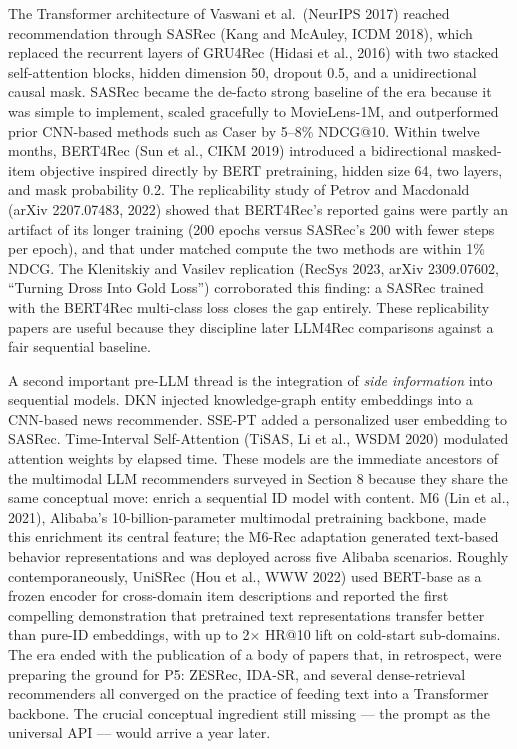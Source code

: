 \documentclass{article}
\begin{document}
The Transformer architecture of Vaswani et al.~(NeurIPS 2017) reached recommendation through SASRec (Kang and McAuley, ICDM 2018), which replaced the recurrent layers of GRU4Rec (Hidasi et al., 2016) with two stacked self-attention blocks, hidden dimension 50, dropout 0.5, and a unidirectional causal mask. SASRec became the de-facto strong baseline of the era because it was simple to implement, scaled gracefully to MovieLens-1M, and outperformed prior CNN-based methods such as Caser by 5--8\% NDCG@10. Within twelve months, BERT4Rec (Sun et al., CIKM 2019) introduced a bidirectional masked-item objective inspired directly by BERT pretraining, hidden size 64, two layers, and mask probability 0.2. The replicability study of Petrov and Macdonald (arXiv 2207.07483, 2022) showed that BERT4Rec's reported gains were partly an artifact of its longer training (200 epochs versus SASRec's 200 with fewer steps per epoch), and that under matched compute the two methods are within 1\% NDCG. The Klenitskiy and Vasilev replication (RecSys 2023, arXiv 2309.07602, ``Turning Dross Into Gold Loss'') corroborated this finding: a SASRec trained with the BERT4Rec multi-class loss closes the gap entirely. These replicability papers are useful because they discipline later LLM4Rec comparisons against a fair sequential baseline.

A second important pre-LLM thread is the integration of \emph{side information} into sequential models. DKN \citep{wang2018www2018} injected knowledge-graph entity embeddings into a CNN-based news recommender. SSE-PT \citep{wu2020sseptsequentialrec} added a personalized user embedding to SASRec. Time-Interval Self-Attention (TiSAS, Li et al., WSDM 2020) modulated attention weights by elapsed time. These models are the immediate ancestors of the multimodal LLM recommenders surveyed in Section 8 because they share the same conceptual move: enrich a sequential ID model with content. M6 (Lin et al., 2021), Alibaba's 10-billion-parameter multimodal pretraining backbone, made this enrichment its central feature; the M6-Rec adaptation generated text-based behavior representations and was deployed across five Alibaba scenarios. Roughly contemporaneously, UniSRec (Hou et al., WWW 2022) used BERT-base as a frozen encoder for cross-domain item descriptions and reported the first compelling demonstration that pretrained text representations transfer better than pure-ID embeddings, with up to 2× HR@10 lift on cold-start sub-domains. The era ended with the publication of a body of papers that, in retrospect, were preparing the ground for P5: ZESRec, IDA-SR, and several dense-retrieval recommenders all converged on the practice of feeding text into a Transformer backbone. The crucial conceptual ingredient still missing --- the prompt as the universal API --- would arrive a year later.
\end{document}
